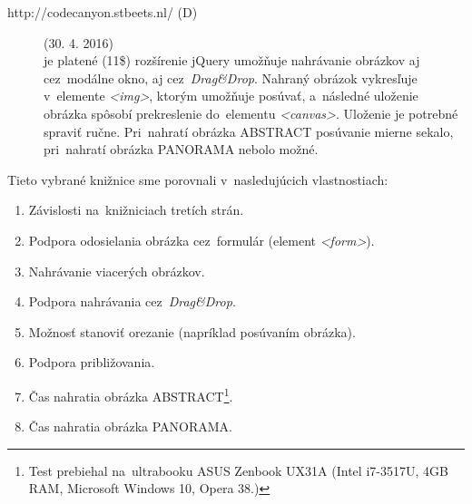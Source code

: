 \begin{description}
	
	\item[http://codecanyon.stbeets.nl/ (D)](30. 4. 2016)\\
	je platené (11\$) rozšírenie jQuery umožňuje nahrávanie obrázkov aj cez~modálne okno, aj cez~\emph{Drag\&Drop}. Nahraný obrázok vykresľuje v~elemente \emph{<img>}, ktorým umožňuje posúvať, a~následné uloženie obrázka spôsobí prekreslenie do~elementu \emph{<canvas>}. Uloženie je potrebné spraviť ručne. Pri~nahratí obrázka ABSTRACT posúvanie mierne sekalo, pri~nahratí obrázka PANORAMA nebolo možné.

\end{description}

Tieto vybrané knižnice sme porovnali v~nasledujúcich vlastnostiach:
\begin{enumerate}
	\item Závislosti na~knižniciach tretích strán.
	\item Podpora odosielania obrázka cez~formulár (element \emph{<form>}).
	\item Nahrávanie viacerých obrázkov.
	\item Podpora nahrávania cez~\emph{Drag\&Drop}.
	\item Možnosť stanoviť orezanie (napríklad posúvaním obrázka).
	\item Podpora približovania.
	\item Čas nahratia obrázka ABSTRACT\footnote{Test prebiehal na~ultrabooku ASUS Zenbook UX31A (Intel i7-3517U, 4GB RAM, Microsoft Windows 10, Opera 38.) }.
	\item Čas nahratia obrázka PANORAMA\footnotemark[\value{footnote}].
\end{enumerate}

